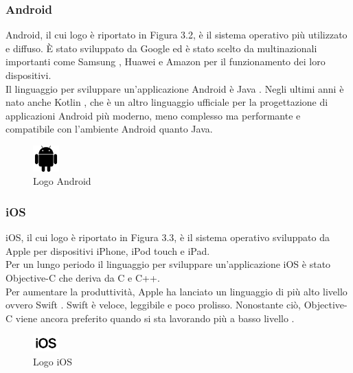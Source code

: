 \subsubsection{Android}
 Android, il cui logo è riportato in Figura 3.2, è il sistema operativo più utilizzato e diffuso. È stato sviluppato da Google ed è stato scelto da multinazionali importanti come Samsung \cite{samsung}, Huawei \cite{huawei} e Amazon \cite{amazon} per il funzionamento dei loro dispositivi.\\
 Il linguaggio per sviluppare un'applicazione Android è Java \cite{java}. Negli ultimi anni è nato anche Kotlin \cite{kotlin}, che è un altro linguaggio ufficiale per la progettazione di applicazioni Android più moderno, meno complesso ma performante e compatibile con l'ambiente Android quanto Java.\\
 \begin{figure}[htbp]	
 	\centering
 	\includegraphics[width=1cm]{immagini/logoandroid.png}
 	\caption{Logo Android}
 	\label{fig:Logo Android}
 \end{figure}

 \newpage

 \subsubsection{iOS}
 iOS, il cui logo è riportato in Figura 3.3, è il sistema operativo sviluppato da Apple per dispositivi iPhone, iPod touch e iPad.\\
 Per un lungo periodo il linguaggio per sviluppare un'applicazione iOS è stato Objective-C che deriva da C e C++. \\
 Per aumentare la produttività, Apple ha lanciato un linguaggio di più alto livello ovvero Swift \cite{swift}. Swift è veloce, leggibile e poco prolisso. Nonostante ciò, Objective-C viene ancora preferito quando si sta lavorando più a basso livello \cite{sviluppo}.\\
\begin{figure}[htbp]	
	\centering
	\includegraphics[width=1cm]{immagini/logoios.jpg}
	\caption{Logo iOS}
	\label{fig:Logo iOS}
\end{figure}

